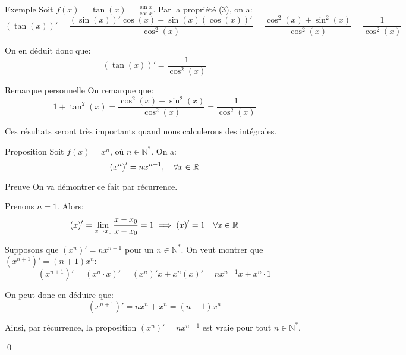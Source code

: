 \documentclass[a4paper]{article}
\begin{document}
\begin{parag}{Exemple}
    Soit $f\left(x\right) = \tan\left(x\right) = \frac{\sin x}{\cos x}$. Par la propriété (3), on a:
    \[\left(\tan\left(x\right)\right)' = \frac{\left(\sin\left(x\right)\right)' \cos\left(x\right) - \sin\left(x\right)\left(\cos\left(x\right)\right)'}{\cos^2\left(x\right)} = \frac{\cos^2\left(x\right) + \sin^2\left(x\right)}{\cos^2\left(x\right)} = \frac{1}{\cos^2\left(x\right)}\]

    On en déduit donc que:
    \[\left(\tan\left(x\right)\right)' = \frac{1}{\cos^2\left(x\right)}\]

    \begin{subparag}{Remarque personnelle}
        On remarque que:
        \[1 + \tan^2\left(x\right) = \frac{\cos^2\left(x\right) + \sin^2\left(x\right)}{\cos^2\left(x\right)} = \frac{1}{\cos^2\left(x\right)}\]

        Ces résultats seront très importants quand nous calculerons des intégrales.
    \end{subparag}
\end{parag}

\begin{parag}{Proposition}
    Soit $f\left(x\right) = x^{n}$, où $n \in \mathbb{N}^*$. On a:
    \[\left(x^{n}\right)' = nx^{n - 1}, \mathspace \forall x \in \mathbb{R}\]

    \begin{subparag}{Preuve}
        On va démontrer ce fait par récurrence.

         Prenons $n = 1$. Alors:
        \[\left(x\right)' = \lim_{x \to x_0} \frac{x - x_0}{x - x_0} = 1 \implies \left(x\right)' = 1 \mathspace \forall x \in \mathbb{R}\]

         Supposons que $\left(x^n\right)' = nx^{n-1}$ pour un $n \in \mathbb{N}^*$. On veut montrer que $\left(x^{n+1}\right)' = \left(n+1\right)x^n$:
        \[\left(x^{n+1}\right)' = \left(x^n \cdot x\right)' = \left(x^n\right)' x + x^n \left(x\right)' = nx^{n-1} x + x^{n}\cdot 1\]

        On peut donc en déduire que:
        \[\left(x^{n+1}\right)' = nx^{n} + x^n = \left(n+1\right)x^{n}\]

        Ainsi, par récurrence, la proposition $\left(x^n\right)' = nx^{n-1}$ est vraie pour tout $n \in \mathbb{N}^*$.

        \qed
    \end{subparag}
\end{parag}
\end{document}
